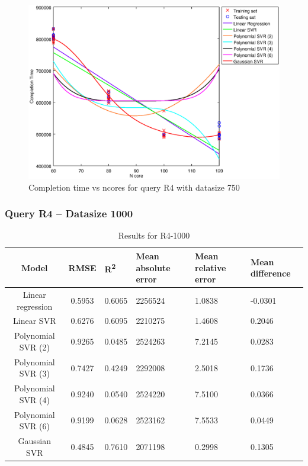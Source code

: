 \documentclass[a4paper,11pt]{article}
\begin{document}
\begin {figure}[hbtp]
\centering
\includegraphics[width=\textwidth]{output/R4_750_ONLY_1_LINEAR_NCORE/plot_R4_750.eps}
\caption{Completion time vs ncores for query R4 with datasize 750}
\label{fig:coreonly_linear_R4_750}
\end {figure}

\newpage
\subsubsection{Query R4 -- Datasize 1000}
\begin{table}[H]
	\centering
	\begin{adjustbox}{center}
		\begin{tabular}{c | c M{1.2cm} M{2.5cm} M{2.5cm} M{1.8cm}}
			Model & RMSE & R\textsuperscript{2} & Mean absolute error & Mean relative error & Mean difference \tabularnewline
			\hline
			Linear regression & 0.5953 & 0.6065 & 2256524 & 1.0838 & -0.0301 \\
			Linear SVR & 0.6276 & 0.6095 & 2210275 & 1.4608 & 0.2046 \\
			Polynomial SVR (2) & 0.9265 & 0.0485 & 2524263 & 7.2145 & 0.0283 \\
			Polynomial SVR (3) & 0.7427 & 0.4249 & 2292008 & 2.5018 & 0.1736 \\
			Polynomial SVR (4) & 0.9240 & 0.0540 & 2524220 & 7.5100 & 0.0366 \\
			Polynomial SVR (6) & 0.9199 & 0.0628 & 2523162 & 7.5533 & 0.0449 \\
			Gaussian SVR & 0.4845 & 0.7610 & 2071198 & 0.2998 & 0.1305 \\
		\end{tabular}
	\end{adjustbox}
	\\
	\caption{Results for R4-1000}
	\label{fig:coreonly_linear_R4_1000}
\end{table}
\end{document}
